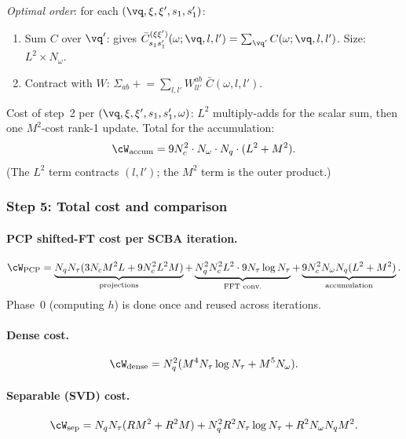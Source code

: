 \emph{Optimal order}: for each $(\vq, \xi, \xi', s_1, s_1')$:
\begin{enumerate}
  \item Sum $C$ over $\vq'$: gives
    $\bar{C}_{s_1 s_1'}^{(\xi\xi')}(\omega;\vq,l,l')
    = \sum_{\vq'} C(\omega;\vq,l,l')$.
    Size: $L^2 \times N_\omega$.
  \item Contract with $W$:
    $\Sigma_{ab} \mathrel{+}= \sum_{l,l'} W_{ll'}^{ab}\;
    \bar{C}(\omega,l,l')$.
\end{enumerate}
Cost of step~2 per $(\vq, \xi, \xi', s_1, s_1', \omega)$:
$L^2$ multiply-adds for the scalar sum, then one $M^2$-cost
rank-1 update.  Total for the accumulation:
\begin{equation}\label{eq:cost_accum}
  \cW_\mathrm{accum}
  = 9 N_c^2 \cdot N_\omega \cdot N_q \cdot (L^2 + M^2).
\end{equation}
(The $L^2$ term contracts $(l,l')$; the $M^2$ term is the outer
product.)


\subsubsection{Step 5: Total cost and comparison}
\label{sssub:step5}

\paragraph{PCP shifted-FT cost per SCBA iteration.}
\begin{equation}\label{eq:cost_pcp_total}
  \cW_\mathrm{PCP}
  = \underbrace{N_q N_\tau (3 N_c M^2 L + 9 N_c^2 L^2 M)}_{\text{projections}}
  + \underbrace{N_q^2 N_c^2 L^2 \cdot 9 N_\tau \log N_\tau}_{\text{FFT conv.}}
  + \underbrace{9 N_c^2 N_\omega N_q (L^2 + M^2)}_{\text{accumulation}}.
\end{equation}
Phase~0 (computing $h$) is done once and reused across iterations.

\paragraph{Dense cost.}
\begin{equation}\label{eq:cost_dense}
  \cW_\mathrm{dense}
  = N_q^2 (M^4 N_\tau \log N_\tau + M^5 N_\omega).
\end{equation}

\paragraph{Separable (SVD) cost.}
\begin{equation}\label{eq:cost_sep}
  \cW_\mathrm{sep}
  = N_q N_\tau (R M^2 + R^2 M) + N_q^2 R^2 N_\tau \log N_\tau
  + R^2 N_\omega N_q M^2.
\end{equation}

